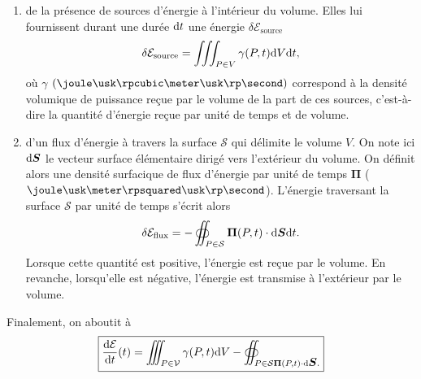 \begin{enumerate}
	\item de la présence de sources d'énergie à l'intérieur
	  du volume. Elles lui fournissent durant une durée $\mathrm{d}t$ une énergie
	  $\delta \mathcal{E}_\mathrm{source}$
	  \begin{equation*}
		  \delta \mathcal{E}_\mathrm{source} = 
		  \iiint_{P \in V} \gamma(P, t) \mathrm{d}V \mathrm{d}t,
	  \end{equation*}
	  où $\gamma$ $(\joule \usk \rpcubic \meter \usk \rp \second)$ 
	  correspond à la densité volumique de puissance 
	  reçue par le volume de la part de ces sources, 
	  c'est-à-dire la quantité d'énergie reçue par unité de temps et de 
	  volume.
  	\item d'un flux d'énergie à travers la surface $\mathcal{S}$ qui délimite le volume
    	$V$. On note ici $\ds$ le vecteur surface élémentaire dirigé vers l'extérieur
	du volume. On définit alors une densité surfacique de flux d'énergie 
	par unité de temps $\mathbf{\Pi}$ ($\joule \usk \meter \rpsquared
	\usk \rp \second$). L'énergie traversant la surface $\mathcal{S}$ par unité de 
	temps s'écrit alors
	\begin{equation*}
		\delta \mathcal{E}_\mathrm{flux} = - \oiint_{P \in \mathcal{S}}
		\mathbf{\Pi}(P, t) \cdot \ds \dt.
	\end{equation*}
	Lorsque cette quantité est positive, l'énergie est reçue par le volume.
	En revanche, lorsqu'elle est négative, l'énergie est transmise à l'extérieur
	par le volume.
\end{enumerate}
Finalement, on aboutit à
\begin{equation*}
	\boxed{\dn{\mathcal{E}}{t}(t) = \iiint_{P \in \mathcal{V}} \gamma(P, t) \dV
	- \oiint_{P \in \mathcal{S} \mathbf{\Pi}(P, t) \cdot \ds.}}
\end{equation*}

